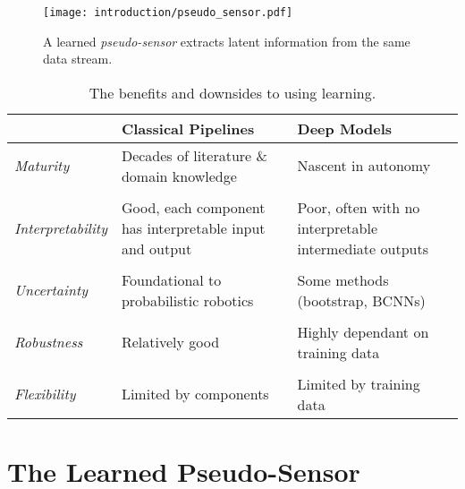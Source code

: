 \begin{figure}
\begin{center}
		\texttt{[image: introduction/pseudo\_sensor.pdf]}
		\caption{A learned \textit{pseudo-sensor} extracts latent information from the same data stream.}
  	\label{fig:intro_pseudo_sensor}
\end{center}
\end{figure}


\begin{table}[h!]
	\caption{The benefits and downsides to using learning.}
	\begin{threeparttable}
	\begin{tabular}{m{}m{}m{}}
		\toprule
		& \textbf{Classical Pipelines} & \textbf{Deep Models} \\ \midrule  
		\textit{Maturity} & Decades of literature \& domain knowledge & Nascent in autonomy \\
		& & \\
		\textit{Interpretability} & Good, each component has interpretable input and output & Poor, often with no interpretable intermediate outputs \\
		& & \\
		\textit{Uncertainty} & Foundational to probabilistic robotics & Some methods (bootstrap, BCNNs)  \\
		& & \\
		\textit{Robustness} & Relatively good & Highly dependant on training data\\
		& & \\
		\textit{Flexibility} & Limited by components & Limited by training data \\
		\bottomrule
	\end{tabular}
\end{threeparttable}
\label{tab:intro_classical_vs_deep}
\end{table}

\section{The Learned Pseudo-Sensor}

